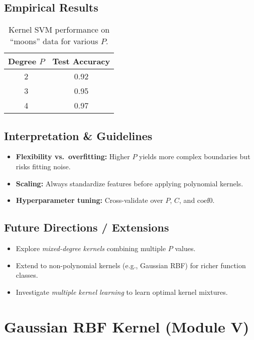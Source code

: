 \documentclass[11pt]{article}
\begin{document}
\subsection{Empirical Results}
\begin{table}[h]
  \centering
  \begin{tabular}{c c}
    \hline
    Degree $P$ & Test Accuracy \\
    \hline
    2 & 0.92 \\
    3 & 0.95 \\
    4 & 0.97 \\
    \hline
  \end{tabular}
  \caption{Kernel SVM performance on “moons” data for various $P$.}
\end{table}

\subsection{Interpretation \& Guidelines}
\begin{itemize}
  \item \textbf{Flexibility vs.\ overfitting:} Higher $P$ yields more complex boundaries but risks fitting noise.
  \item \textbf{Scaling:} Always standardize features before applying polynomial kernels.
  \item \textbf{Hyperparameter tuning:} Cross-validate over $P$, $C$, and $\text{coef0}$.
\end{itemize}

\subsection{Future Directions / Extensions}
\begin{itemize}
  \item Explore \emph{mixed-degree kernels} combining multiple $P$ values.
  \item Extend to non-polynomial kernels (e.g., Gaussian RBF) for richer function classes.
  \item Investigate \emph{multiple kernel learning} to learn optimal kernel mixtures.
\end{itemize}

\section{Gaussian RBF Kernel (Module V)}
\end{document}
